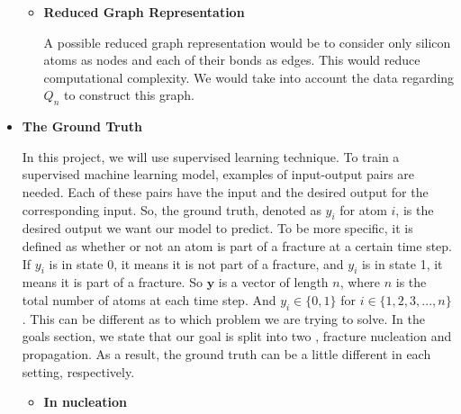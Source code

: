 \begin{itemize}
\begin{itemize}
    
\item \textbf{Reduced Graph Representation} 

A possible reduced graph representation would be to consider only silicon atoms as nodes and each of their bonds as edges. This would reduce computational complexity. We would take into account the data regarding $Q_n$ to construct this graph.
    
\end{itemize}
\bigskip

\item \textbf{The Ground Truth}

In this project, we will use supervised learning technique. To train a supervised machine learning model, examples of input-output pairs are needed. Each of these pairs have the input and the desired output for the corresponding input. So, the ground truth, denoted as $y_i$ for atom $i$, is the desired output we want our model to predict. To be more specific, it is defined as whether or not an atom is part of a fracture at a certain time step. If $y_i$ is in state 0, it means it is not part of a fracture, and $y_i$ is in state 1, it means it is part of a fracture. So $\mathbf{y}$ is a vector of length $n$, where $n$ is the total number of atoms at each time step. And $y_i\in\{0,1\}$ for $i\in\{1,2,3,...,n\}$. This can be different as to which problem we are trying to solve. In the goals section, we state that our goal is split into two , fracture nucleation and propagation. As a result, the ground truth can be a little different in each setting, respectively.

\begin{itemize}
    \item \textbf{In nucleation}
    

\end{itemize}
\end{itemize}
